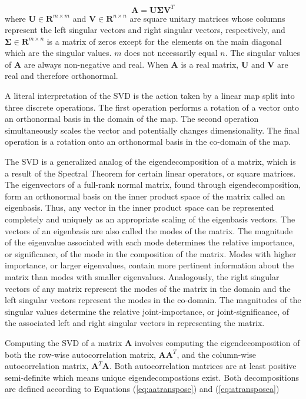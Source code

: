 \documentclass[conference]{IEEEtran}
\begin{document}
    \begin{equation}
        \mathbf{A} = \mathbf{U\Sigma }{\mathbf{V}^T}
    \label{eq:svddef}
    \end{equation}
    where $\mathbf{U} \in \mathbf{R}^{m \times m}$ and $\mathbf{V} \in \mathbf{R}^{n \times n}$ are square unitary
    matrices whose columns represent the left singular vectors and right singular vectors, respectively, and $\mathbf{\Sigma} \in \mathbf{R}^{m \times n}$ is a matrix of zeros except for the elements on the main diagonal which are the singular values. $m$ does not necessarily equal $n$. The singular values of $\mathbf{A}$ are always non-negative and real. When $\mathbf{A}$ is a real matrix, $\mathbf{U}$ and $\mathbf{V}$ are real and therefore orthonormal.

    A literal interpretation of the SVD is the action taken by a linear map split into three discrete operations. The first operation performs a rotation of a vector onto an orthonormal basis in the domain of the map. The second operation simultaneously scales the vector and potentially changes dimensionality. The final operation is a rotation onto an orthonormal basis in the co-domain of the map.

    The SVD is a generalized analog of the eigendecomposition of a matrix, which is a result of the Spectral Theorem for certain linear operators, or square matrices. The eigenvectors of a full-rank normal matrix, found through eigendecomposition, form an orthonormal basis on the inner product space of the matrix called an eigenbasis. Thus, any vector in the inner product space can be represented completely and uniquely as an appropriate scaling of the eigenbasis vectors. The vectors of an eigenbasis are also called the modes of the matrix. The magnitude of the eigenvalue associated with each mode determines the relative importance, or significance, of the mode in the composition of the matrix. Modes with higher importance, or larger eigenvalues, contain more pertinent information about the matrix than modes with smaller eigenvalues. Analogously, the right singular vectors of any matrix represent the modes of the matrix in the domain and the left singular vectors represent the modes in the co-domain. The magnitudes of the singular values determine the relative joint-importance, or joint-significance, of the associated left and right singular vectors in representing the matrix.

    Computing the SVD of a matrix $\mathbf{A}$ involves computing the eigendecomposition of both the row-wise autocorrelation matrix, $\mathbf{AA}^T$, and the column-wise autocorrelation matrix, $\mathbf{A}^T\mathbf{A}$. Both autocorrelation matrices are at least positive semi-definite which means unique eigendecompostions exist. Both decompositions are defined according to Equations (\ref{eq:aatranspose}) and (\ref{eq:atransposea})
\end{document}
